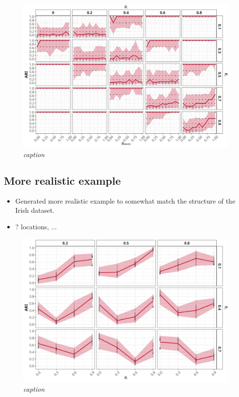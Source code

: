 \documentclass{article}
\numberwithin{equation}{section}
\begin{document}
\begin{itemize}
\begin{figure}[H]
    \centering
    \includegraphics[width = 0.9\linewidth]{plots/sim_01c_js_sens_3_var_dqu_0.9.png}
    \caption{\emph{caption}}
    \label{fig:02_3d}
\end{figure}

\subsection{More realistic example} \label{subsec:sim_realistic}

\begin{itemize}
    \item Generated more realistic example to somewhat match the structure of the Irish dataset. 
    \item ? locations, ... 
\end{itemize}

\begin{figure}[H]
    \centering
    \includegraphics[width = 0.9\linewidth]{plots/sim_01d_js_sens_3_var_dqu_0.9.png}
    \caption{\emph{caption}}
    \label{fig:03_realistic}
\end{figure}




\end{itemize}
\end{document}
